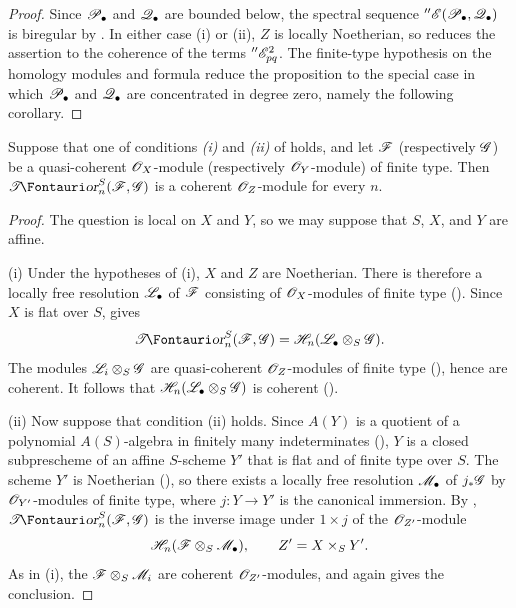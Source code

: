 \begin{proof}
Since $\mathscr{P}_\bullet$ and $\mathscr{Q}_\bullet$ are bounded below, the
spectral sequence
$''\mathscr{E}(\mathscr{P}_\bullet,\mathscr{Q}_\bullet)$ is biregular by
.  In either case (i) or (ii), $Z$ is locally
Noetherian, so  reduces the assertion to the
coherence of the terms $''\mathscr{E}_{pq}^2$.  The finite-type
hypothesis on the homology modules and formula
 reduce the proposition to the special case in
which $\mathscr{P}_\bullet$ and $\mathscr{Q}_\bullet$ are concentrated in
degree zero, namely the following corollary.
\end{proof}

\begin{corollary}[6.5.14]
\label{III.6.5.14}
Suppose that one of conditions \emph{(i)} and \emph{(ii)} of
 holds, and let $\mathscr{F}$ (respectively $\mathscr{G}$)
be a quasi-coherent $\mathscr{O}_X$-module (respectively
$\mathscr{O}_Y$-module) of finite type.  Then
$\shTor_n^S(\sh F,\sh G)$ is a coherent $\mathscr{O}_Z$-module for
every $n$.
\end{corollary}

\begin{proof}
The question is local on $X$ and $Y$, so we may suppose that
$S$, $X$, and $Y$ are affine.

\textnormal{(i)} Under the hypotheses of (i), $X$ and $Z$
are Noetherian.  There is therefore a locally free resolution
$\mathscr{L}_\bullet$ of $\mathscr{F}$ consisting of $\mathscr{O}_X$-modules of
finite type ().  Since $X$ is flat over $S$,
 gives
\[
  \shTor_n^S(\sh F,\sh G)
  =
  \sh H_n(\sh L_\bullet\otimes_S\sh G).
\]
The modules $\mathscr{L}_i\otimes_S\mathscr{G}$ are quasi-coherent
$\mathscr{O}_Z$-modules of finite type (), hence are
coherent.  It follows that
$\mathscr{H}_n(\mathscr{L}_\bullet\otimes_S\mathscr{G})$ is coherent
().

\textnormal{(ii)} Now suppose that condition (ii) holds.  Since
$A(Y)$ is a quotient of a polynomial $A(S)$-algebra in finitely
many indeterminates (), $Y$ is a closed
subprescheme of an affine $S$-scheme $Y'$ that is flat and of
finite type over $S$.  The scheme $Y'$ is Noetherian
(), so there exists a locally free resolution
$\mathscr{M}_\bullet$ of $j_*\mathscr{G}$ by $\mathscr{O}_{Y'}$-modules of finite
type, where $j:Y\to Y'$ is the canonical immersion.  By
, $\shTor_n^S(\sh F,\sh G)$ is the inverse image
under $1\times j$ of the $\mathscr{O}_{Z'}$-module
\[
  \mathscr{H}_n(\mathscr{F}\otimes_S\mathscr{M}_\bullet),
  \qquad Z'=X\times_SY'.
\]
As in (i), the $\mathscr{F}\otimes_S\mathscr{M}_i$ are coherent
$\mathscr{O}_{Z'}$-modules, and  again gives the
conclusion.
\end{proof}

